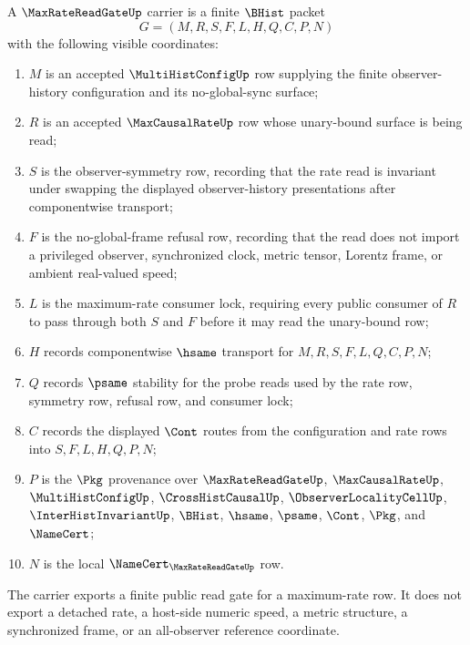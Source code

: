 \begin{definition}
\label{def:max-rate-read-gate-carrier}
A $\MaxRateReadGateUp$ carrier is a finite $\BHist$ packet
$$
G=(M,R,S,F,L,H,Q,C,P,N)
$$
with the following visible coordinates:
\begin{enumerate}
\item $M$ is an accepted $\MultiHistConfigUp$ row supplying the finite observer-history configuration and its no-global-sync surface;
\item $R$ is an accepted $\MaxCausalRateUp$ row whose unary-bound surface is being read;
\item $S$ is the observer-symmetry row, recording that the rate read is invariant under swapping the displayed observer-history presentations after componentwise transport;
\item $F$ is the no-global-frame refusal row, recording that the read does not import a privileged observer, synchronized clock, metric tensor, Lorentz frame, or ambient real-valued speed;
\item $L$ is the maximum-rate consumer lock, requiring every public consumer of $R$ to pass through both $S$ and $F$ before it may read the unary-bound row;
\item $H$ records componentwise $\hsame$ transport for $M,R,S,F,L,Q,C,P,N$;
\item $Q$ records $\psame$ stability for the probe reads used by the rate row, symmetry row, refusal row, and consumer lock;
\item $C$ records the displayed $\Cont$ routes from the configuration and rate rows into $S,F,L,H,Q,P,N$;
\item $P$ is the $\Pkg$ provenance over $\MaxRateReadGateUp$, $\MaxCausalRateUp$, $\MultiHistConfigUp$, $\CrossHistCausalUp$, $\ObserverLocalityCellUp$, $\InterHistInvariantUp$, $\BHist$, $\hsame$, $\psame$, $\Cont$, $\Pkg$, and $\NameCert$;
\item $N$ is the local $\NameCert_{\MaxRateReadGateUp}$ row.
\end{enumerate}
The carrier exports a finite public read gate for a maximum-rate row. It does not export a detached rate, a host-side numeric speed, a metric structure, a synchronized frame, or an all-observer reference coordinate.
\end{definition}

